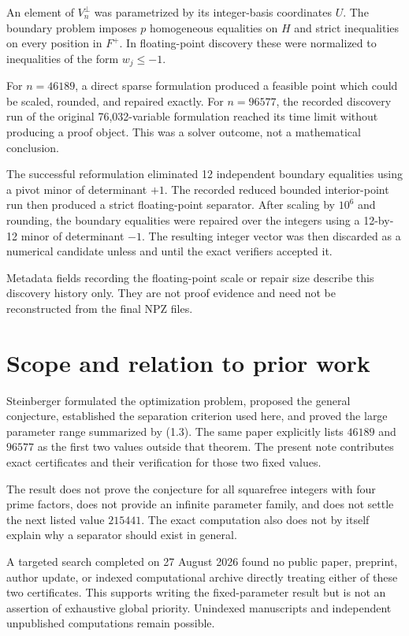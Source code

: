 \documentclass[11pt]{article}
\numberwithin{equation}{section}
\begin{document}
An element of $V_n^\perp$ was parametrized by its integer-basis coordinates
$U$. The boundary problem imposes $p$ homogeneous equalities on $H$ and strict
inequalities on every position in $F^+$. In floating-point discovery these
were normalized to inequalities of the form $w_j\leq-1$.

For $n=46189$, a direct sparse formulation produced a feasible point which
could be scaled, rounded, and repaired exactly. For $n=96577$, the recorded
discovery run of the original 76,032-variable formulation reached its time
limit without producing a proof object. This was a solver outcome, not a
mathematical conclusion.

The successful reformulation eliminated 12 independent boundary equalities
using a pivot minor of determinant $+1$. The recorded reduced bounded
interior-point run then produced a strict floating-point separator.
After scaling by $10^6$ and rounding, the boundary equalities were repaired
over the integers using a 12-by-12 minor of determinant $-1$. The resulting
integer vector was then discarded as a numerical candidate unless and until
the exact verifiers accepted it.

Metadata fields recording the floating-point scale or repair size describe
this discovery history only. They are not proof evidence and need not be
reconstructed from the final NPZ files.

\section{Scope and relation to prior work}


Steinberger \cite{steinberger2012} formulated the optimization problem, proposed the general
conjecture, established the separation criterion used here, and proved the
large parameter range summarized by (1.3). The same paper explicitly lists
$46189$ and $96577$ as the first two values outside that theorem. The present
note contributes exact certificates and their verification for those two
fixed values.

The result does not prove the conjecture for all squarefree integers with four
prime factors, does not provide an infinite parameter family, and does not
settle the next listed value $215441$. The exact computation also does not by
itself explain why a separator should exist in general.

A targeted search completed on 27 August 2026 found no public paper, preprint,
author update, or indexed computational archive directly treating either of
these two certificates. This supports writing the fixed-parameter result but
is not an assertion of exhaustive global priority. Unindexed manuscripts and
independent unpublished computations remain possible.
\end{document}
